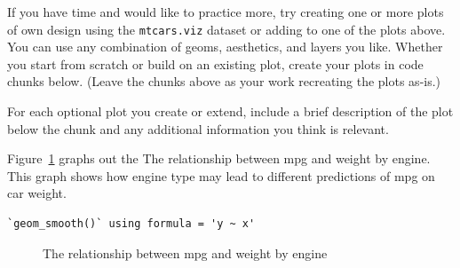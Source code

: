 \documentclass[
  man,
  floatsintext,
  longtable,
  nolmodern,
  notxfonts,
  notimes,
  colorlinks=true,linkcolor=blue,citecolor=blue,urlcolor=blue]{apa7}
\begin{document}
If you have time and would like to practice more, try creating one or
more plots of own design using the \texttt{mtcars.viz} dataset or adding
to one of the plots above. You can use any combination of geoms,
aesthetics, and layers you like. Whether you start from scratch or build
on an existing plot, create your plots in code chunks below. (Leave the
chunks above as your work recreating the plots as-is.)

For each optional plot you create or extend, include a brief description
of the plot below the chunk and any additional information you think is
relevant.

Figure~\ref{fig-optional-plot-1} graphs out the The relationship between
mpg and weight by engine. This graph shows how engine type may lead to
different predictions of mpg on car weight.

\begin{verbatim}
`geom_smooth()` using formula = 'y ~ x'
\end{verbatim}

\begin{figure}

\caption{\label{fig-optional-plot-1}The relationship between mpg and
weight by engine}


\end{figure}%
\end{document}
